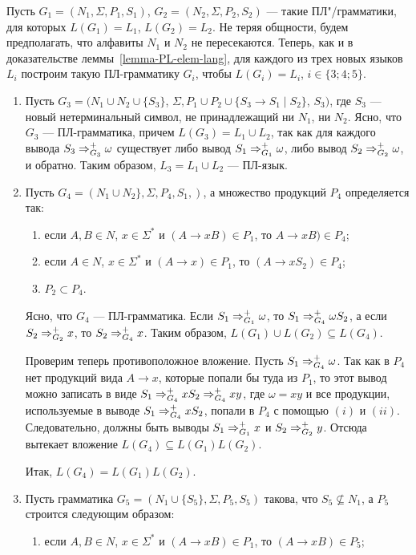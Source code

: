 \begin{myproof}
Пусть $G_1=(N_1,\Sigma,P_1,S_1)$, $G_2=(N_2,\Sigma,P_2,S_2)$ --- такие ПЛ"/грамматики, для которых $L(G_1)=L_1$, $L(G_2)=L_2$. Не теряя общности, будем предполагать, что алфавиты $N_1$ и $N_2$ не пересекаются. Теперь, как и в доказательстве леммы~\ref{lemma-PL-elem-lang}, для каждого из трех новых языков $L_i$ построим такую ПЛ-грамматику $G_i$, чтобы $L(G_i)=L_i$, $i\in\{3;4;5\}$.
\begin{enumerate}
\item Пусть $G_3 = (N_1\cup N_2\cup\{S_3\}$, $\Sigma, P_1\cup P_2\cup\{S_3\to S_1\mid S_2\}$, $S_3)$, где $S_3$ --- новый нетерминальный символ, не принадлежащий ни $N_1$, ни $N_2$. Ясно, что $G_3$ --- ПЛ-грамматика, причем $L(G_3)=L_1\cup L_2$, так как для каждого вывода $S_3\Rightarrow_{G_3}^+\omega$ существует либо вывод $S_1\Rightarrow_{G_1}^+\omega$, либо вывод $S_2\Rightarrow_{G_2}^+\omega$, и обратно. Таким образом, $L_3=L_1\cup L_2$ --- ПЛ-язык.

\item Пусть $G_4=(N_1 \cup N_2 \}, \Sigma, P_4, S_1,)$, а множество продукций $P_4$ определяется так:

\begin{enumerate}[label=(\emph{\roman*})]
	\item если $A,B\in N$, $x\in\Sigma^*$ и $(A\to xB)\in P_1$, то $A\to xB)\in P_4$;
	\item если $A\in N$, $x\in\Sigma^*$ и $(A\to x)\in P_1$, то $(A\to xS_2)\in P_4$;
	\item $P_2\subset P_4$.
\end{enumerate}
Ясно, что $G_4$ --- ПЛ-грамматика. Если $S_1\Rightarrow_{G_1}^+\omega$, то $S_1\Rightarrow_{G_4}^+\omega S_2$, а если $S_2\Rightarrow_{G_2}^+x$, то $S_2\Rightarrow_{G_4}^+x$. Таким образом, $L(G_1)\cup L(G_2)\subseteq L(G_4)$.

Проверим теперь противоположное вложение. Пусть $S_1\Rightarrow_{G_4}^+\omega$. Так как в $P_4$ нет продукций вида $A\to x$, которые попали бы туда из $P_1$, то этот вывод можно записать в виде $S_1\Rightarrow_{G_4}^+xS_2\Rightarrow_{G_4}^+xy$, где $\omega=xy$ и все продукции, используемые в выводе $S_1\Rightarrow_{G_4}^+xS_2$, попали в $P_4$ с помощью $(i)$ и $(ii)$. Следовательно, должны быть выводы $S_1\Rightarrow_{G_1}^+x$ и $S_2\Rightarrow_{G_2}^+y$. Отсюда вытекает вложение $L(G_4)\subseteq L(G_1)L(G_2)$.

Итак, $L(G_4)=L(G_1)L(G_2)$.

\item Пусть грамматика $G_5=(N_1\cup \{S_5\},\Sigma,P_5,S_5)$ такова, что $S_5\nsubseteq N_1$, а $P_5$ строится следующим образом:
\begin{enumerate}[label=(\emph{\roman*})]
	\item если $A,B\in N$, $x\in\Sigma^*$ и $(A\to xB)\in P_1$, то $(A\to xB)\in P_5$;


\end{enumerate}
\end{enumerate}
\end{myproof}

